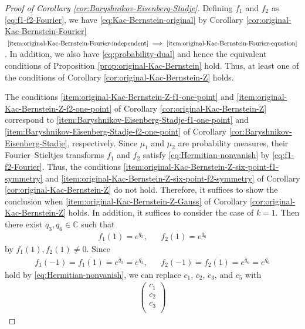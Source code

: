 \documentclass[12pt]{article}
\theoremstyle{definition}
\theoremstyle{remark}
\numberwithin{equation}{section}
\numberwithin{figure}{section}
\numberwithin{table}{section}
\begin{document}
\begin{proof}[Proof of Corollary \ref{cor:Baryshnikov-Eisenberg-Stadje}]

Defining $ f_1 $ and $ f_2 $ as \eqref{eq:f1-f2-Fourier}, we have \eqref{eq:Kac-Bernstein-original} by Corollary \ref{cor:original-Kac-Bernstein-Fourier} $ \text{ \ref{item:original-Kac-Bernstein-Fourier-independent} } \Longrightarrow \text{ \ref{item:original-Kac-Bernstein-Fourier-equation} } $.
In addition, we also have \eqref{eq:probability-dual} and hence the equivalent conditions of Proposition \ref{prop:original-Kac-Bernstein} hold.
Thus, at least one of the conditions of Corollary \ref{cor:original-Kac-Bernstein-Z} holds.

The conditions \ref{item:original-Kac-Bernstein-Z-f1-one-point} and \ref{item:original-Kac-Bernstein-Z-f2-one-point} of Corollary \ref{cor:original-Kac-Bernstein-Z} correspond to \ref{item:Baryshnikov-Eisenberg-Stadje-f1-one-point} and \ref{item:Baryshnikov-Eisenberg-Stadje-f2-one-point} of Corollary \ref{cor:Baryshnikov-Eisenberg-Stadje}, respectively.
Since $ \mu_1 $ and $ \mu_2 $ are probability measures, their Fourier--Stieltjes transforms $ f_1 $ and $ f_2 $ satisfy \eqref{eq:Hermitian-nonvanish} by \eqref{eq:f1-f2-Fourier}.
Thus, the conditions \ref{item:original-Kac-Bernstein-Z-six-point-f1-symmetry} and \ref{item:original-Kac-Bernstein-Z-six-point-f2-symmetry} of Corollary \ref{cor:original-Kac-Bernstein-Z} do not hold.
Therefore, it suffices to show the conclusion when \ref{item:original-Kac-Bernstein-Z-Gauss} of Corollary \ref{cor:original-Kac-Bernstein-Z} holds.
In addition, it suffices to consider the case of $ k = 1 $.
Then there exist $ q_3 , q_6 \in \mathbb{ C } $ such that
\begin{align}
    f_1 ( 1 ) = e^{ q_3 }, & & f_2 ( 1 ) = e^{ q_6 }
\end{align}
by $ f_1 ( 1 ), f_2 ( 1 ) \neq 0 $.
Since
\begin{align}
    f_1 ( - 1 ) = \overline{ f_1 ( 1 ) } = \overline{ e^{ q_3 } } = e^{ \overline{ q_3 } } , & &
    f_2 ( - 1 ) = \overline{ f_2 ( 1 ) } = \overline{ e^{ q_6 } } = e^{ \overline{ q_6 } }
\end{align}
hold by \eqref{eq:Hermitian-nonvanish}, we can replace $ c_1 $, $ c_2 $, $ c_3 $, and $ c_5 $ with
\begin{align}
    \begin{pmatrix}
        c_1 \\
        c_2 \\
        c_3 \\

\end{pmatrix}
\end{align}
\end{proof}
\end{document}
